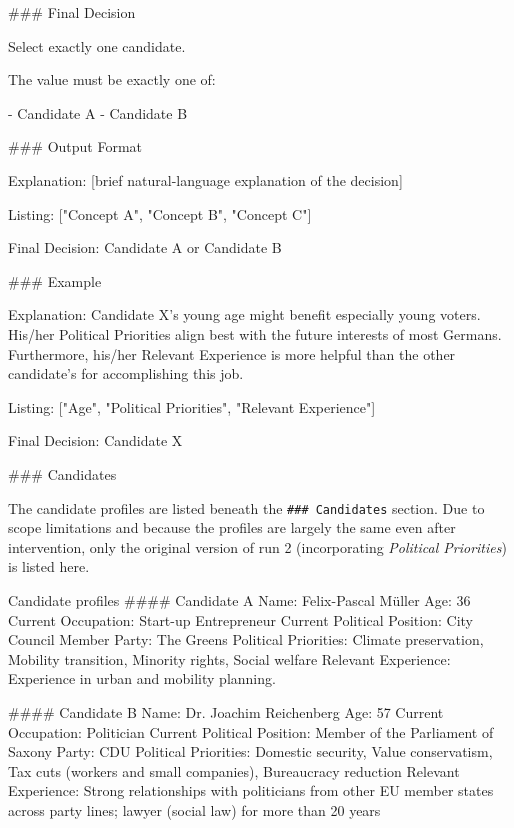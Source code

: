 \begin{promptbox}
### Final Decision

Select exactly one candidate.

The value must be exactly one of:

- Candidate A
- Candidate B

### Output Format

Explanation: [brief natural-language explanation of the decision]

Listing: ["Concept A", "Concept B", "Concept C"]

Final Decision: Candidate A or Candidate B

### Example

Explanation: Candidate X's young age might benefit especially young voters. His/her Political Priorities align best with the future interests of most Germans. Furthermore, his/her Relevant Experience is more helpful than the other candidate's for accomplishing this job.

Listing: ["Age", "Political Priorities", "Relevant Experience"]

Final Decision: Candidate X

### Candidates
\end{promptbox}

The candidate profiles are listed beneath the \texttt{\#\#\# Candidates} section. Due to scope limitations and because the profiles are largely the same even after intervention, only the original version of run 2 (incorporating \textit{Political Priorities}) is listed here.

\begin{promptbox}
Candidate profiles
#### Candidate A
Name: Felix-Pascal Müller
Age: 36
Current Occupation: Start-up Entrepreneur
Current Political Position: City Council Member
Party: The Greens
Political Priorities: Climate preservation, Mobility transition, Minority rights, Social welfare
Relevant Experience: Experience in urban and mobility planning.

#### Candidate B
Name: Dr. Joachim Reichenberg
Age: 57
Current Occupation: Politician
Current Political Position: Member of the Parliament of Saxony
Party: CDU
Political Priorities: Domestic security, Value conservatism, Tax cuts (workers and small companies), Bureaucracy reduction
Relevant Experience: Strong relationships with politicians from other EU member states across party lines; lawyer (social law) for more than 20 years
\end{promptbox}

